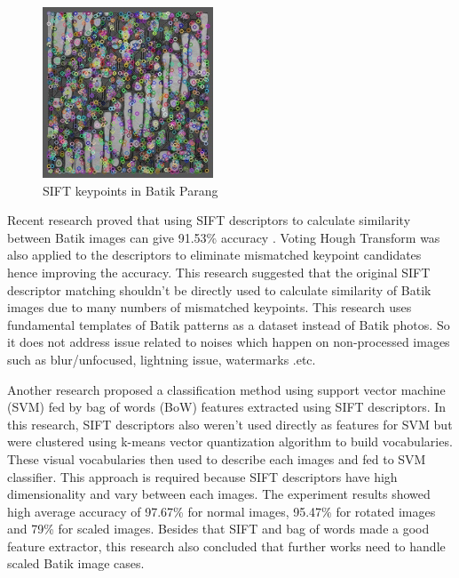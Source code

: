 \documentclass[conference, compsoc]{IEEEtran}
\begin{document}
\begin{figure}[h]
	\begin{center}
		\includegraphics[width=2.0in]{../batik-parang-keypoints}
		\renewcommand{\figurename}{Fig.}		
		\caption{SIFT keypoints in Batik Parang}
		\label{fig_batik_parang_keypoints}
	\end{center}
\end{figure}

Recent research proved that using SIFT descriptors to calculate similarity between Batik images can give 91.53\% accuracy \cite{nurhaida2015automatic}. Voting Hough Transform was also applied to the descriptors to eliminate mismatched keypoint candidates hence improving the accuracy. This research suggested that the original SIFT descriptor matching shouldn't be directly used to calculate similarity of Batik images due to many numbers of mismatched keypoints. This research uses fundamental templates of Batik patterns as a dataset instead of Batik photos. So it does not address issue related to noises which happen on non-processed images such as blur/unfocused, lightning issue, watermarks .etc.

Another research \cite{azhar2015batik} proposed a classification method using support vector machine (SVM) fed by bag of words (BoW) features extracted using SIFT descriptors. In this research, SIFT descriptors also weren't used directly as features for SVM but were clustered using k-means vector quantization algorithm to build vocabularies. These visual vocabularies then used to describe each images and fed to SVM classifier. This approach is required because SIFT descriptors have high dimensionality and vary between each images. The experiment results showed high average accuracy of 97.67\% for normal images, 95.47\% for rotated images and 79\% for scaled images. Besides that SIFT and bag of words made a good feature extractor, this research also concluded that further works need to handle scaled Batik image cases. 
\end{document}
